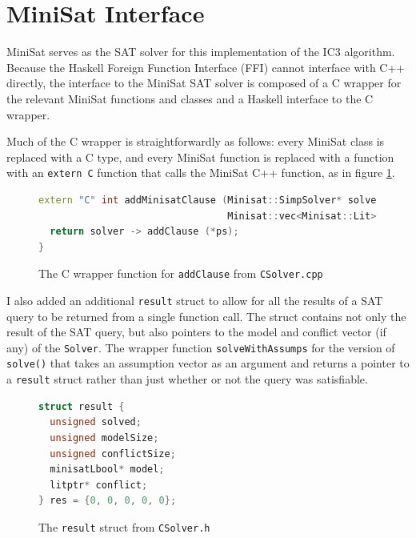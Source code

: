 \documentclass[12pt,a4paper,twoside,openright]{report}
\begin{document}
{\section{MiniSat Interface}

MiniSat serves as the SAT solver for this implementation of the IC3 algorithm.
Because the Haskell Foreign Function Interface (FFI) cannot interface with C++ directly,
the interface to the MiniSat SAT solver is composed of a C wrapper for the relevant
MiniSat functions and classes and a Haskell interface to the C wrapper.

Much of the C wrapper is straightforwardly as follows: every MiniSat class is replaced with a C
type, and every MiniSat function is replaced with a function with an \verb,extern C, function that
calls the MiniSat C++ function, as in figure \ref{addClause}.

\begin{figure}[ht]
\begin{lstlisting}[language = C++]
extern "C" int addMinisatClause (Minisat::SimpSolver* solver,
                                 Minisat::vec<Minisat::Lit>* ps) {
  return solver -> addClause (*ps);
}
\end{lstlisting}
\caption{The C wrapper function for {\tt addClause} from {\tt CSolver.cpp}}
\label{addClause}
\end{figure}

I also added an additional \verb,result, struct to allow for all the results of a SAT query to
be returned from a single function call. The struct contains not only the result of the SAT
query, but also pointers to the model and conflict vector (if any) of the \verb,Solver,.
The wrapper function \verb,solveWithAssumps, for the version of \verb,solve(), that takes an assumption
vector as an argument and returns a pointer to a \verb,result, struct
rather than just whether or not the query was satisfiable.

\begin{figure}[ht]
\begin{lstlisting}[language=C]
struct result {
  unsigned solved;
  unsigned modelSize;
  unsigned conflictSize;
  minisatLbool* model;
  litptr* conflict;
} res = {0, 0, 0, 0, 0};
\end{lstlisting}
\caption{The {\tt result} struct from {\tt CSolver.h}}
\end{figure}

}
\end{document}
